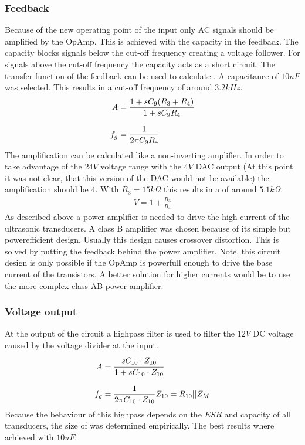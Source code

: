 \subsubsection*{Feedback}
%
Because of the new operating point of the input only AC signals should be amplified by the OpAmp. This is achieved with the capacity  in the feedback. The capacity blocks signals below the cut-off frequency creating a voltage follower. For signals above the cut-off frequency the capacity acts as a short circuit. The transfer function of the feedback can be used to calculate . A capacitance of $10nF$ was selected. This results in a cut-off frequency of around $3.2kHz$.
%
\begin{align}
  A &= \frac{1 + s C_9 (R_3 + R_4)}{1 + s C_9 R_4}\pmath
  f_g &= \frac{1}{2 \pi C_9 R_4}
\end{align}
%
The amplification can be calculated like a non-inverting amplifier. In order to take advantage of the $24V$ voltage range with the $4V$ DAC output (At this point it was not clear, that this version of the DAC would not be available) the amplification should be $4$. With $R_3 = 15k\Omega$ this results in a  of around $5.1k\Omega$.
%
\begin{align}
  V = 1 + \frac{R_3}{R_4}
\end{align}
%
As described above a power amplifier is needed to drive the high current of the ultrasonic transducers. A class B amplifier was chosen because of its simple but powerefficient design. Usually this design causes crossover distortion. This is solved by putting the feedback behind the power amplifier. Note, this circuit design is only possible if the OpAmp is powerfull enough to drive the base current of the transistors. A better solution for higher currents would be to use the more complex class AB power amplifier.\p
%
\subsubsection*{Voltage output}
At the output of the circuit a highpass filter is used to filter the $12V$ DC voltage caused by the voltage divider at the input.
%
\begin{align}
  A &= \cfrac{sC_{10} \cdot Z_{10}}{1 + sC_{10} \cdot Z_{10}} \pmath
  f_g &= \frac{1}{2 \pi C_{10} \cdot Z_{10}}
  Z_{10} = R_{10} || Z_M
\end{align}
%
Because the behaviour of this highpass depends on the $ESR$ and capacity of all transducers, the size of  was determined empirically. The best results where achieved with $10uF$.\p

